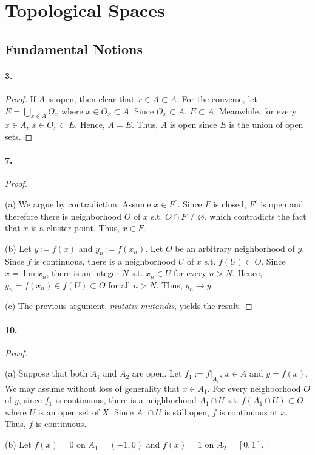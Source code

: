 \section{Topological Spaces}
\subsection{Fundamental Notions}
\paragraph{3.}
\begin{proof}
  If $A$ is open, then clear that $x \in A \subset A$. For the converse, let 
  $E = \bigcup_{x\in A}O_x$ where $x\in O_x \subset A$. Since $O_x\subset A$,
  $E \subset A$. Meanwhile, for every $x\in A$, $x \in O_x\subset E$. Hence, 
  $A = E$. Thus, $A$ is open since $E$ is the union of open sets.
\end{proof}

\paragraph{7.}
\begin{proof}
  $\,$\par
  (a) We argue by contradiction. Assume $x \in F^c$. Since $F$ is closed, $F^c$
  is open and therefore there is neighborhood $O$ of $x$ s.t. $O \cap F
  \ne \varnothing$, which contradicts the fact that $x$ is a cluster point.
  Thus, $x \in F$.
  
  (b) Let $y := f(x)$ and $y_n := f(x_n)$. Let $O$ be an arbitrary
  neighborhood of $y$. Since $f$ is continuous, there is a neighborhood $U$ of
  $x$ s.t. $f(U) \subset O$. Since $x = \lim x_n$, there is an integer $N$ s.t.
  $x_n \in U$ for every $n > N$. Hence, $y_n = f(x_n) \in f(U) \subset O$ for
  all $n > N$. Thus, $y_n \to y$.
  
  (c) The previous argument, \textit{mutatis mutandis}, yields the result.
\end{proof}

\paragraph{10.}
\begin{proof}
  $\,$\par
  (a) Suppose that both $A_1$ and $A_2$ are open.
  Let $f_1 := f|_{A_1}$, $x\in A$ and $y = f(x)$. We may assume without
  loss of generality that $x \in A_1$. For every neighborhood $O$ of $y$, since
  $f_1$ is continuous, there is a neighborhood $A_1\cap U$ s.t. $f(A_1\cap U)
  \subset O$ where $U$ is an open set of $X$. Since $A_1\cap U$ is still open,
  $f$ is continuous at $x$. Thus, $f$ is continuous.
  
  (b) Let $f(x) = 0$ on $A_1 = (-1, 0)$ and $f(x) = 1$ on $A_2 = [0, 1]$.
\end{proof}

